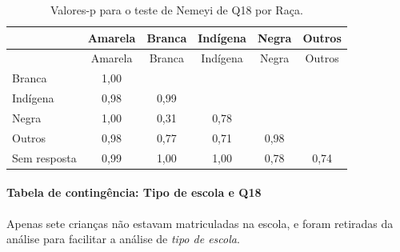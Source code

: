 \documentclass[]{article}
\let\oldparagraph\paragraph
\renewcommand{\paragraph}[1]{\oldparagraph{#1}\mbox{}}
\begin{document}
\begin{longtable}[]{@{}lccccc@{}}
\caption{\label{tab:unnamed-chunk-287}Valores-p para o teste de Nemeyi de Q18 por Raça.}\tabularnewline
\toprule
& Amarela & Branca & Indígena & Negra & Outros\tabularnewline
\midrule
\endfirsthead
\toprule
& Amarela & Branca & Indígena & Negra & Outros\tabularnewline
\midrule
\endhead
Branca & 1,00 & & & &\tabularnewline
Indígena & 0,98 & 0,99 & & &\tabularnewline
Negra & 1,00 & 0,31 & 0,78 & &\tabularnewline
Outros & 0,98 & 0,77 & 0,71 & 0,98 &\tabularnewline
Sem resposta & 0,99 & 1,00 & 1,00 & 0,78 & 0,74\tabularnewline
\bottomrule
\end{longtable}

\cleardoublepage

\hypertarget{tabela-de-continguxeancia-tipo-de-escola-e-q18}{%
\paragraph{Tabela de contingência: Tipo de escola e Q18}\label{tabela-de-continguxeancia-tipo-de-escola-e-q18}}

Apenas sete crianças não estavam matriculadas na escola, e foram retiradas da análise para facilitar a análise de \emph{tipo de escola}.
\end{document}
